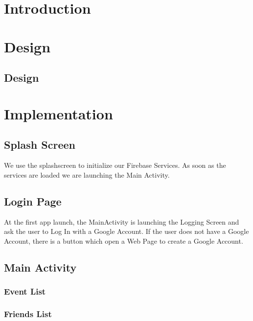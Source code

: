 \documentclass[a4paper,11pt, oneside]{book}
\author{Luc Dupuis, Quentin Tardivon, Ragul Sankar, Asmita Belle}
\date{\today}
\begin{document}
	\begin{titlepage}
		
	\end{titlepage}


	\newpage\newpage\null\thispagestyle{empty}
	\newpage
		\tableofcontents
		\thispagestyle{empty}


	\chapter{Introduction}
	\setcounter{page}{1}

	\chapter{Design}

		\section{Design}

	\chapter{Implementation}

		\section{Splash Screen}

		We use the splashscreen to initialize our Firebase Services. As soon as the services are loaded 
		we are launching the Main Activity.

		\section{Login Page}
		
		At the first app launch, the MainActivity is launching the Logging Screen and ask the user 
		to Log In with a Google Account. If the user does not have a Google Account, there is a button 
		which open a Web Page to create a Google Account. 
	\section{Main Activity}

		\subsection{Event List}	

		\subsection{Friends List}
\end{document}

